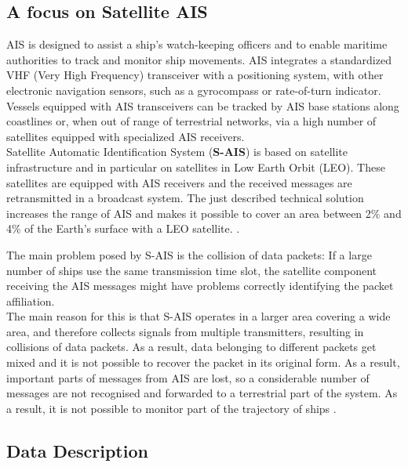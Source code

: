     \subsection{A focus on Satellite AIS}
    AIS is designed to assist a ship's watch-keeping officers and to enable maritime authorities to track and monitor ship movements. AIS integrates a standardized VHF (Very High Frequency) transceiver with a positioning system, with other electronic navigation sensors, such as a gyrocompass or rate-of-turn indicator. Vessels equipped with AIS transceivers can be tracked by AIS base stations along coastlines or, when out of range of terrestrial networks, via a high number of satellites equipped with specialized AIS receivers. 
    \\
    Satellite Automatic Identification System (\textbf{S-AIS}) is based on satellite infrastructure and in particular on satellites in Low Earth Orbit (LEO). These satellites are equipped with AIS receivers and the received messages are retransmitted in a broadcast system.
    The just described technical solution increases the range of AIS and makes it possible to cover an area between 2\% and 4\% of the Earth's surface with a LEO satellite. \cite{dbscan_ais}.
    
    The main problem posed by S-AIS is the collision of data packets: If a large number of ships use the same transmission time slot, the satellite component receiving the AIS messages might have problems correctly identifying the packet affiliation.
    \\
    The main reason for this is that S-AIS operates in a larger area covering a wide area, and therefore collects signals from multiple transmitters, resulting in collisions of data packets.
    As a result, data belonging to different packets get mixed and it is not possible to recover the packet in its original form. As a result, important parts of messages from AIS are lost, so a considerable number of messages are not recognised and forwarded to a terrestrial part of the system. As a result, it is not possible to monitor part of the trajectory of ships \cite{dbscan_ais}.
    

    \subsection{Data Description}
    
